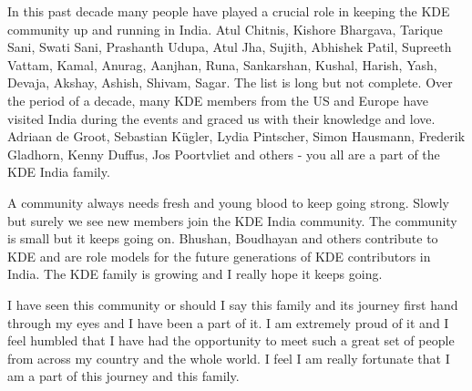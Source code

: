 In this past decade many people have played a crucial role in keeping the KDE community up and running in India. Atul Chitnis, Kishore Bhargava, Tarique Sani, Swati Sani, Prashanth Udupa, Atul Jha, Sujith, Abhishek Patil, Supreeth Vattam, Kamal, Anurag, Aanjhan, Runa, Sankarshan, Kushal, Harish, Yash, Devaja, Akshay, Ashish, Shivam, Sagar. The list is long but not complete. Over the period of a decade, many KDE members from the US and Europe have visited India during the events and graced us with their knowledge and love. Adriaan de Groot, Sebastian K\"{u}gler, Lydia Pintscher, Simon Hausmann, Frederik Gladhorn, Kenny Duffus, Jos Poortvliet and others - you all are a part of the KDE India family.

A community always needs fresh and young blood to keep going strong. Slowly but surely we see new members join the KDE India community. The community is small but it keeps going on. Bhushan, Boudhayan and others contribute to KDE and are role models for the future generations of KDE contributors in India. The KDE family is growing and I really hope it keeps going.

I have seen this community or should I say this family and its journey first hand through my eyes and I have been a part of it. I am extremely proud of it and I feel humbled that I have had the opportunity to meet such a great set of people from across my country and the whole world. I feel I am really fortunate that I am a part of this journey and this family.
